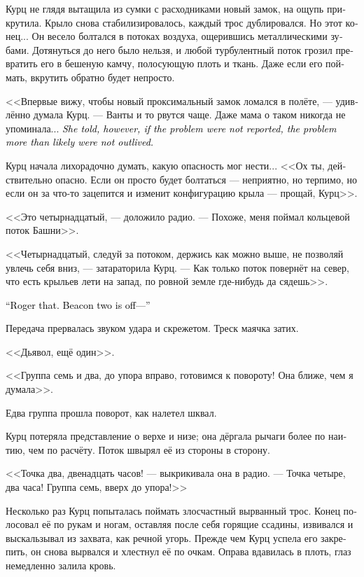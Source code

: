 \documentclass[a4paper,12pt,fleqn]{book}\usepackage{cooltooltips}\usepackage{polyglossia}\setdefaultlanguage[babelshorthands=true]{russian}\setotherlanguage{english}\defaultfontfeatures{Ligatures=TeX,Mapping=tex-text} \usepackage{xcolor}\definecolor{lightgray}{HTML}{bbbbbb}\color{lightgray}\newcommand{\ml}[3]{\textenglish{\textcolor{black}{#3}}}
\begin{document}
Курц не глядя вытащила из сумки с расходниками новый замок, на ощупь прикрутила.
Крыло снова стабилизировалось, каждый трос дублировался.
Но этот конец...
Он весело болтался в потоках воздуха, ощерившись металлическими зубами.
Дотянуться до него было нельзя, и любой турбулентный поток грозил превратить его в бешеную камчу, полосующую плоть и ткань.
Даже если его поймать, вкрутить обратно будет непросто.

<<Впервые вижу, чтобы новый проксимальный замок ломался в полёте, --- удивлённо думала Курц.
--- Ванты и то рвутся чаще.
Даже мама о таком никогда не упоминала...
\ml{$0$}
{Впрочем, она говорила, что если о проблеме никто не сообщал --- вполне вероятно, что проблему никто не пережил>>.}
{\textit{She told, however, if the problem were not reported, the problem more than likely were not outlived.}}

Курц начала лихорадочно думать, какую опасность мог нести...
<<Ох ты, действительно опасно.
Если он просто будет болтаться --- неприятно, но терпимо, но если он за что-то зацепится и изменит конфигурацию крыла --- прощай, Курц>>.

<<Это четырнадцатый, --- доложило радио.
--- Похоже, меня поймал кольцевой поток Башни>>.

<<Четырнадцатый, следуй за потоком, держись как можно выше, не позволяй увлечь себя вниз, --- затараторила Курц.
--- Как только поток повернёт на север, что есть крыльев лети на запад, по ровной земле где-нибудь да сядешь>>.

\ml{$0$}
{<<Понял.}
{``Roger that.}
\ml{$0$}
{Ориентир два --- отбой...>>}
{Beacon two is off---''}

Передача прервалась звуком удара и скрежетом.
Треск маячка затих.

<<Дьявол, ещё один>>.

<<Группа семь и два, до упора вправо, готовимся к повороту!
Она ближе, чем я думала>>.

Едва группа прошла поворот, как налетел шквал.

Курц потеряла представление о верхе и низе;
она дёргала рычаги более по наитию, чем по расчёту.
Поток швырял её из стороны в сторону.

<<Точка два, двенадцать часов! --- выкрикивала она в радио.
--- Точка четыре, два часа!
Группа семь, вверх до упора!>>

Несколько раз Курц попыталась поймать злосчастный вырванный трос.
Конец полосовал её по рукам и ногам, оставляя после себя горящие ссадины, извивался и выскальзывал из захвата, как речной угорь.
Прежде чем Курц успела его закрепить, он снова вырвался и хлестнул её по очкам.
Оправа вдавилась в плоть, глаз немедленно залила кровь.
\end{document}
